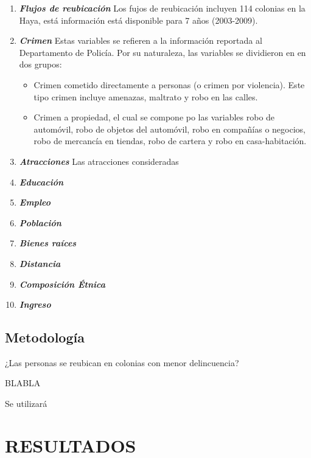 \documentclass[letterpaper, 10 pt, conference]{ieeeconf}  %
\begin{document}
\begin{enumerate}
\item \textit{\textbf{Flujos de reubicaci\'on}}
Los fujos de reubicaci\'on incluyen 114 colonias en la Haya, est\'a informaci\'on est\'a disponible para 7 años (2003-2009).
\item \textit{\textbf{Crimen}}
Estas variables se refieren a la informaci\'on reportada al Departamento de Polic\'ia. Por su naturaleza, las variables se dividieron en en dos grupos: 
\begin{itemize}
\item Crimen cometido directamente a personas (o crimen por violencia). Este tipo crimen incluye amenazas, maltrato y robo en las calles.
\item Crimen a propiedad, el cual se compone po las variables robo de autom\'ovil, robo de objetos del autom\'ovil, robo en compañ\'ias o negocios, robo de mercanc\'ia en tiendas, robo de cartera y robo en casa-habitaci\'on.
\end{itemize}

\item \textit{\textbf{Atracciones}}
Las atracciones consideradas

\item \textit{\textbf{Educaci\'on}}

\item \textit{\textbf{Empleo}}

\item \textit{\textbf{Poblaci\'on}}

\item \textit{\textbf{Bienes ra\'ices}}

\item \textit{\textbf{Distancia}}

\item \textit{\textbf{Composici\'on \'Etnica}}

\item \textit{\textbf{Ingreso}}

\end{enumerate}

\subsection{Metodolog\'ia}

¿Las personas se reubican en colonias con menor delincuencia?

BLABLA

Se utilizar\'a 

\section{RESULTADOS}
\end{document}

